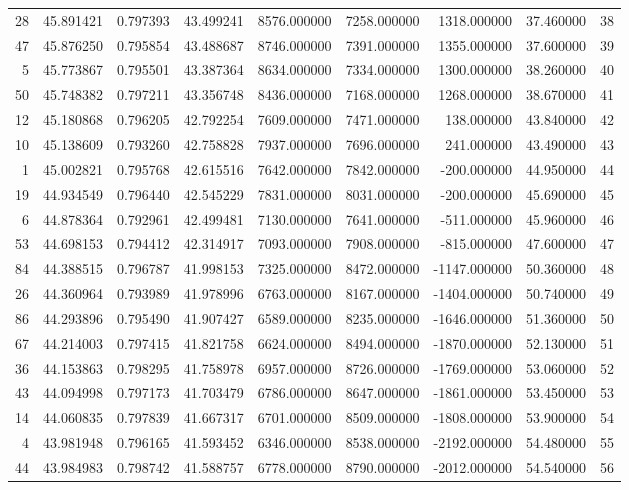 \begin{tabular}{rrrrrrrrr}
28 & 45.891421 & 0.797393 & 43.499241 & 8576.000000 & 7258.000000 & 1318.000000 & 37.460000 & 38 \\
47 & 45.876250 & 0.795854 & 43.488687 & 8746.000000 & 7391.000000 & 1355.000000 & 37.600000 & 39 \\
5 & 45.773867 & 0.795501 & 43.387364 & 8634.000000 & 7334.000000 & 1300.000000 & 38.260000 & 40 \\
50 & 45.748382 & 0.797211 & 43.356748 & 8436.000000 & 7168.000000 & 1268.000000 & 38.670000 & 41 \\
12 & 45.180868 & 0.796205 & 42.792254 & 7609.000000 & 7471.000000 & 138.000000 & 43.840000 & 42 \\
10 & 45.138609 & 0.793260 & 42.758828 & 7937.000000 & 7696.000000 & 241.000000 & 43.490000 & 43 \\
1 & 45.002821 & 0.795768 & 42.615516 & 7642.000000 & 7842.000000 & -200.000000 & 44.950000 & 44 \\
19 & 44.934549 & 0.796440 & 42.545229 & 7831.000000 & 8031.000000 & -200.000000 & 45.690000 & 45 \\
6 & 44.878364 & 0.792961 & 42.499481 & 7130.000000 & 7641.000000 & -511.000000 & 45.960000 & 46 \\
53 & 44.698153 & 0.794412 & 42.314917 & 7093.000000 & 7908.000000 & -815.000000 & 47.600000 & 47 \\
84 & 44.388515 & 0.796787 & 41.998153 & 7325.000000 & 8472.000000 & -1147.000000 & 50.360000 & 48 \\
26 & 44.360964 & 0.793989 & 41.978996 & 6763.000000 & 8167.000000 & -1404.000000 & 50.740000 & 49 \\
86 & 44.293896 & 0.795490 & 41.907427 & 6589.000000 & 8235.000000 & -1646.000000 & 51.360000 & 50 \\
67 & 44.214003 & 0.797415 & 41.821758 & 6624.000000 & 8494.000000 & -1870.000000 & 52.130000 & 51 \\
36 & 44.153863 & 0.798295 & 41.758978 & 6957.000000 & 8726.000000 & -1769.000000 & 53.060000 & 52 \\
43 & 44.094998 & 0.797173 & 41.703479 & 6786.000000 & 8647.000000 & -1861.000000 & 53.450000 & 53 \\
14 & 44.060835 & 0.797839 & 41.667317 & 6701.000000 & 8509.000000 & -1808.000000 & 53.900000 & 54 \\
4 & 43.981948 & 0.796165 & 41.593452 & 6346.000000 & 8538.000000 & -2192.000000 & 54.480000 & 55 \\
44 & 43.984983 & 0.798742 & 41.588757 & 6778.000000 & 8790.000000 & -2012.000000 & 54.540000 & 56 \\

\end{tabular}
